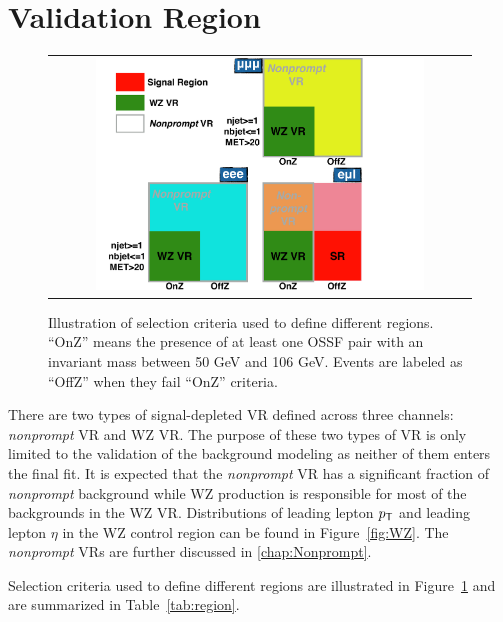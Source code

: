 \section{Validation Region}
\label{sec:VR}

\begin{figure}[tbh!]
 \begin{center}
 \begin{tabular}{c}
 \includegraphics[width=0.8\textwidth]{figures/Part3/Selection/Event}
 \end{tabular}
 \caption{Illustration of selection criteria used to define different regions. ``OnZ'' means the presence of at least one \ac{OSSF} pair with an invariant mass between 50 GeV and 106 GeV. Events are labeled as ``OffZ'' when they fail ``OnZ'' criteria.}
 \label{fig:Event}
 \end{center}
\end{figure}

There are two types of signal-depleted \ac{VR} defined across three channels: \emph{nonprompt} \ac{VR} and WZ \ac{VR}. The purpose of these two types of \ac{VR} is only limited to the validation of the background modeling as neither of them enters the final fit. It is expected that the \emph{nonprompt} \ac{VR} has a significant fraction of \emph{nonprompt} background while WZ production is responsible for most of the backgrounds in the WZ \ac{VR}. Distributions of leading lepton $p_{\textsf{T}}$ and leading lepton $\eta$ in the WZ control region can be found in Figure~\ref{fig:WZ}. The \emph{nonprompt} \acp{VR} are further discussed in \autoref{chap:Nonprompt}.

Selection criteria used to define different regions are illustrated in Figure~\ref{fig:Event} and are summarized in Table~\ref{tab:region}.

